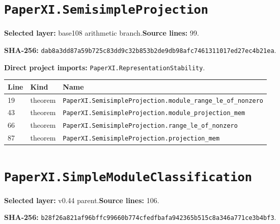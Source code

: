 \documentclass[10pt,oneside]{book}
\begin{document}
\section{\texorpdfstring{\nolinkurl{PaperXI.SemisimpleProjection}}{PaperXI.SemisimpleProjection}}\label{module:PaperXI.SemisimpleProjection}

\textbf{Selected layer:} base108 arithmetic branch.\quad\textbf{Source lines:} 99.\par\textbf{SHA-256:} {\scriptsize\nolinkurl{dab8a3dd87a59b725c83dd9c32b853b2de9db98afc7461311017ed27ec4b21ea}}.


\textbf{Direct project imports:} \nolinkurl{PaperXI.RepresentationStability}.

\begin{longtable}{@{}p{}p{}p{}@{}}\toprule Line&Kind&Name\\\midrule\endhead

19&theorem&\nolinkurl{PaperXI.SemisimpleProjection.module_range_le_of_nonzero}\\

43&theorem&\nolinkurl{PaperXI.SemisimpleProjection.module_projection_mem}\\

66&theorem&\nolinkurl{PaperXI.SemisimpleProjection.range_le_of_nonzero}\\

87&theorem&\nolinkurl{PaperXI.SemisimpleProjection.projection_mem}\\

\bottomrule\end{longtable}

\section{\texorpdfstring{\nolinkurl{PaperXI.SimpleModuleClassification}}{PaperXI.SimpleModuleClassification}}\label{module:PaperXI.SimpleModuleClassification}

\textbf{Selected layer:} v0.44 parent.\quad\textbf{Source lines:} 106.\par\textbf{SHA-256:} {\scriptsize\nolinkurl{b28f26a821af96bffc99660b774cfedfbafa942365b515c8a346a771ce3b4bf3}}.

\end{document}
